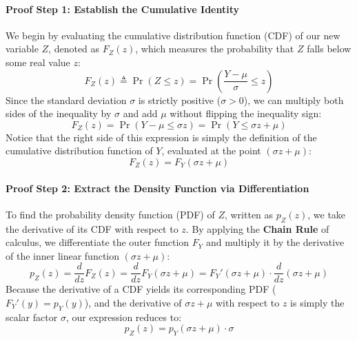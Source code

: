 \documentclass{article}
\begin{document}
\paragraph{Proof Step 1: Establish the Cumulative Identity}
We begin by evaluating the cumulative distribution function (CDF) of our new variable $Z$, denoted as $F_Z(z)$, which measures the probability that $Z$ falls below some real value $z$:
\begin{equation}
    F_Z(z) \triangleq \Pr(Z \le z) = \Pr\left( \frac{Y - \mu}{\sigma} \le z \right)
\end{equation}
Since the standard deviation $\sigma$ is strictly positive ($\sigma > 0$), we can multiply both sides of the inequality by $\sigma$ and add $\mu$ without flipping the inequality sign:
\begin{equation}
    F_Z(z) = \Pr(Y - \mu \le \sigma z) = \Pr(Y \le \sigma z + \mu)
\end{equation}
Notice that the right side of this expression is simply the definition of the cumulative distribution function of $Y$, evaluated at the point $(\sigma z + \mu)$:
\begin{equation}
    F_Z(z) = F_Y(\sigma z + \mu)
\end{equation}

\paragraph{Proof Step 2: Extract the Density Function via Differentiation}
To find the probability density function (PDF) of $Z$, written as $p_Z(z)$, we take the derivative of its CDF with respect to $z$. By applying the \textbf{Chain Rule} of calculus, we differentiate the outer function $F_Y$ and multiply it by the derivative of the inner linear function $(\sigma z + \mu)$:
\begin{equation}
    p_Z(z) = \frac{d}{dz} F_Z(z) = \frac{d}{dz} F_Y(\sigma z + \mu) = F_Y'(\sigma z + \mu) \cdot \frac{d}{dz}(\sigma z + \mu)
\end{equation}
Because the derivative of a CDF yields its corresponding PDF ($F_Y'(y) = p_Y(y)$), and the derivative of $\sigma z + \mu$ with respect to $z$ is simply the scalar factor $\sigma$, our expression reduces to:
\begin{equation}
    p_Z(z) = p_Y(\sigma z + \mu) \cdot \sigma
\end{equation}
\end{document}
